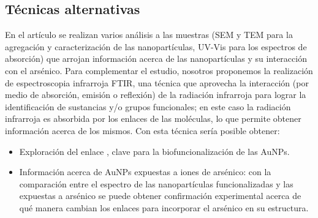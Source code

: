 \subsection{Técnicas alternativas}

En el artículo se realizan varios análisis a las muestras (SEM y TEM para la
agregación y caracterización de las nanopartículas, UV-Vis para los espectros de
absorción) que arrojan información acerca de las nanopartículas y su interacción
con el arsénico. Para complementar el estudio, nosotros proponemos la
realización de espectroscopia infrarroja FTIR, una técnica que aprovecha la
interacción (por medio de absorción, emisión o reflexión) de la radiación
infrarroja para lograr la identificación de sustancias y/o grupos funcionales;
en este caso la radiación infrarroja es absorbida por los enlaces de las
moléculas, lo que permite obtener información acerca de los mismos. Con esta
técnica sería posible obtener:
\begin{itemize}
	\item Exploración del enlace , clave para la biofuncionalización de las
		AuNPs.
	\item Información acerca de AuNPs expuestas a iones de arsénico: con la
		comparación entre el espectro de las nanopartículas funcionalizadas y las
		expuestas a arsénico se puede obtener confirmación experimental acerca de
		qué manera cambian los enlaces para incorporar el arsénico en su
		estructura.
\end{itemize}
